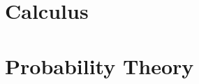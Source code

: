 \documentclass{elegantbook}
\begin{document}
\tableofcontents
\mainmatter
\hypersetup{pageanchor=true}

\part{Calculus}





\part{Probability Theory}





\end{document}
